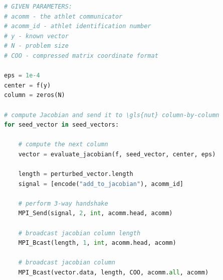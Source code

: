 \begin{minipage}{\linewidth}
\begin{lstlisting}[language=python, caption={Pseudocode of the default \gls{athlet}-\gls{nut} coupling: \gls{athlet} part}, frame=single, label={lst:athlet-grs-defaul:athlet}]
# GIVEN PARAMETERS:
# acomm - the athlet communicator
# acomm_id - athlet identification number 
# y - known vector
# N - problem size
# COO - compressed matrix coordinate format

eps = 1e-4
center = f(y)
column = zeros(N)

# compute Jacobian and send it to \gls{nut} column-by-column
for seed_vector in seed_vectors:

	# compute the next column
	vector = evaluate_jacobian(f, seed_vector, center, eps)
	
	length = perturbed_vector.length
	signal = [encode("add_to_jacobian"), acomm_id]
	
	# perform 3-way handshake
	MPI_Send(signal, 2, int, acomm.head, acomm)
	
	# broadcast jacobian column length
	MPI_Bcast(length, 1, int, acomm.head, acomm)
	
	# broadcast jacobian column
	MPI_Bcast(vector.data, length, COO, acomm.all, acomm)
	

\end{lstlisting}
\end{minipage}




